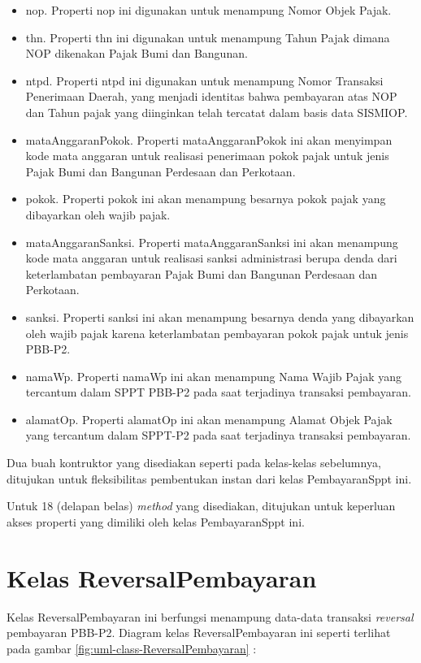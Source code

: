 \begin{itemize}
\item nop. Properti nop ini digunakan untuk menampung Nomor Objek Pajak.
\item thn. Properti thn ini digunakan untuk menampung Tahun Pajak dimana NOP dikenakan Pajak Bumi dan Bangunan.
\item ntpd. Properti ntpd ini digunakan untuk menampung Nomor Transaksi Penerimaan Daerah, yang menjadi identitas bahwa pembayaran atas NOP dan Tahun pajak yang diinginkan telah tercatat dalam basis data SISMIOP.
\item mataAnggaranPokok. Properti mataAnggaranPokok ini akan menyimpan kode mata anggaran untuk realisasi penerimaan pokok pajak untuk jenis Pajak Bumi dan Bangunan Perdesaan dan Perkotaan.
\item pokok. Properti pokok ini akan menampung besarnya pokok pajak yang dibayarkan oleh wajib pajak.
\item mataAnggaranSanksi. Properti mataAnggaranSanksi ini akan menampung kode mata anggaran untuk realisasi sanksi administrasi berupa denda dari keterlambatan pembayaran Pajak Bumi dan Bangunan Perdesaan dan Perkotaan.
\item sanksi. Properti sanksi ini akan menampung besarnya denda yang dibayarkan oleh wajib pajak karena keterlambatan pembayaran pokok pajak untuk jenis PBB-P2.
\item namaWp. Properti namaWp ini akan menampung Nama Wajib Pajak yang tercantum dalam SPPT PBB-P2 pada saat terjadinya transaksi pembayaran.
\item alamatOp. Properti alamatOp ini akan menampung Alamat Objek Pajak yang tercantum dalam SPPT-P2 pada saat terjadinya transaksi pembayaran.
\end{itemize}

Dua buah kontruktor yang disediakan seperti pada kelas-kelas sebelumnya, ditujukan untuk fleksibilitas pembentukan instan dari kelas PembayaranSppt ini.

Untuk 18 (delapan belas) \textit{method} yang disediakan, ditujukan untuk keperluan akses properti yang dimiliki oleh kelas PembayaranSppt ini.

\section{Kelas ReversalPembayaran}

Kelas ReversalPembayaran ini berfungsi menampung data-data transaksi \textit{reversal} pembayaran PBB-P2. Diagram kelas ReversalPembayaran ini seperti terlihat pada gambar \ref{fig:uml-class-ReversalPembayaran} :

